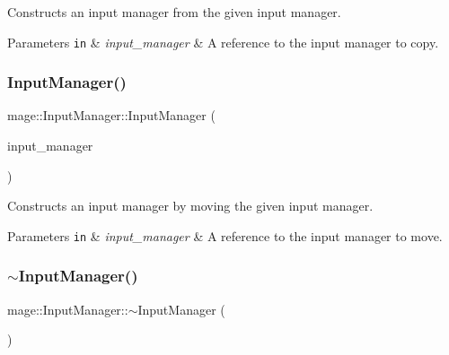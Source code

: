 Constructs an input manager from the given input manager.


\begin{DoxyParams}[1]{Parameters}
\mbox{\tt in}  & {\em input\+\_\+manager} & A reference to the input manager to copy. \\
\hline
\end{DoxyParams}
\hypertarget{classmage_1_1_input_manager_ae9e37a3157c7880aa09226e56c4e97c4}{}\label{classmage_1_1_input_manager_ae9e37a3157c7880aa09226e56c4e97c4} 
\subsubsection{\texorpdfstring{Input\+Manager()}{InputManager()}\hspace{0.1cm}{\footnotesize\ttfamily [3/3]}}
{\footnotesize\ttfamily mage\+::\+Input\+Manager\+::\+Input\+Manager (\begin{DoxyParamCaption}\item[{\hyperlink{classmage_1_1_input_manager}{Input\+Manager} \&\&}]{input\+\_\+manager }\end{DoxyParamCaption})\hspace{0.3cm}{\ttfamily [default]}}

Constructs an input manager by moving the given input manager.


\begin{DoxyParams}[1]{Parameters}
\mbox{\tt in}  & {\em input\+\_\+manager} & A reference to the input manager to move. \\
\hline
\end{DoxyParams}
\hypertarget{classmage_1_1_input_manager_a287ca0e91ec079227c102f7eadd5bb46}{}\label{classmage_1_1_input_manager_a287ca0e91ec079227c102f7eadd5bb46} 
\subsubsection{\texorpdfstring{$\sim$\+Input\+Manager()}{~InputManager()}}
{\footnotesize\ttfamily mage\+::\+Input\+Manager\+::$\sim$\+Input\+Manager (\begin{DoxyParamCaption}{ }\end{DoxyParamCaption})\hspace{0.3cm}{\ttfamily [default]}}

